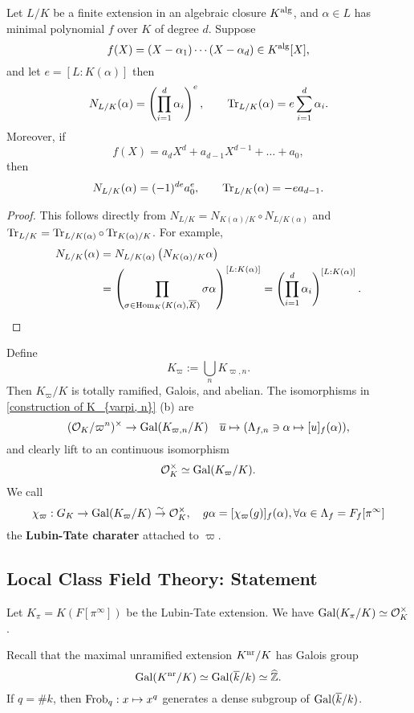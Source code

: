\begin{lemma}\label{compute norm and trace from minimal polynomial}
    Let $L/K$ be a finite extension in an algebraic closure $K^{\mathrm{alg}}$, and $\alpha\in L$ has minimal polynomial $f$ over $K$ of degree $d$. Suppose \[f(X) = (X-\alpha_1)\cdots(X-\alpha_d)\in K^{\mathrm{alg}}[X],\] and let $e = [L : K(\alpha)]$
    then \[N_{L/K}(\alpha) = \left(\prod_{i = 1}^d \alpha_i\right)^e,\qquad \operatorname{Tr}_{L/K}(\alpha) = e\sum_{i = 1}^d \alpha_i.\]
    Moreover, if \[f(X) = a_dX^d + a_{d-1}X^{d-1} + \dots + a_0,\]then \[N_{L/K}(\alpha) = (-1)^{de}a_0^e,\qquad \operatorname{Tr}_{L/K}(\alpha) = -ea_{d-1}.\]
\end{lemma}
\begin{proof}
    This follows directly from $N_{L/K} = N_{K(\alpha)/K}\circ N_{L/K(\alpha)}$ and $\operatorname{Tr}_{L/K} = \operatorname{Tr}_{L/K(\alpha)}\circ \operatorname{Tr}_{K(\alpha)/K}$.
    For example,
    \begin{align*}
        N_{L/K}(\alpha) &= N_{L/K(\alpha)}\left( N_{K(\alpha)/K}\alpha \right)\\ &
        = \left( \prod_{\sigma\in\operatorname{Hom}_{K}(K(\alpha), \overline K)}\sigma\alpha \right)^{[L : K(\alpha)]} = \left( \prod_{i=1}^d\alpha_i  \right)^{[L : K(\alpha)]}.\qedhere
    \end{align*}
\end{proof}


Define \[K_\varpi := \bigcup_{n} K_{\varpi, n}.\]
Then $K_\varpi/K$ is totally ramified, Galois, and abelian.
The isomorphisms in \cref{construction of K_{varpi, n}} (b) are
\[(\mathcal{O}_K/\varpi^n)^\times\to \operatorname{Gal}(K_{\varpi, n}/K)\quad \overline{u}\mapsto (\Lambda_{f, n}\ni \alpha\mapsto [u]_f(\alpha)),\]
and clearly lift to an continuous isomorphism
\[\mathcal{O}_K^\times\simeq \operatorname{Gal}(K_\varpi/K).\]
We call \[\chi_\varpi : G_K\to\operatorname{Gal}(K_\varpi/K)\stackrel{\sim}{\rightarrow} \mathcal{O}_K^\times,\quad g\alpha = [\chi_\varpi(g)]_{f}(\alpha),\forall\alpha\in \Lambda_f = F_f[\pi^\infty]\]
the \textbf{Lubin-Tate charater} attached to $\varpi$.


\subsection{Local Class Field Theory: Statement}
Let $K_\pi = K(F[\pi^\infty])$ be the Lubin-Tate extension. We have $\operatorname{Gal}(K_\pi/K)\simeq \mathcal{O}_K^\times$.

Recall that the maximal unramified extension $K^{\mathrm{nr}}/K$ has Galois group \[\operatorname{Gal}(K^{\mathrm{nr}}/K)\simeq\operatorname{Gal}(\overline k/k)\simeq\widehat{\mathbb{Z}}.\]
If $q = \# k$, then $\operatorname{Frob}_q : x\mapsto x^q$ generates a dense subgroup of $\operatorname{Gal}(\overline k/k)$.

